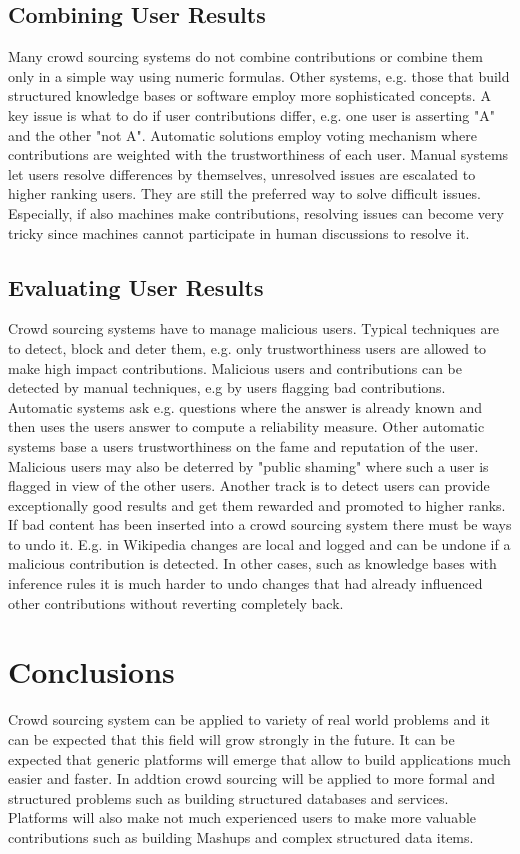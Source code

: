 \documentclass{sig-alternate}
\begin{document}
\subsection{Combining User Results}
Many crowd sourcing systems do not combine contributions or combine them only in a simple way using numeric formulas. Other systems, e.g. those that build structured knowledge bases or software employ more sophisticated concepts. A key issue is what to do if user contributions differ, e.g. one user is asserting "A" and the other "not A". Automatic solutions employ voting mechanism where contributions are weighted with the trustworthiness of each user. Manual systems let users resolve differences by themselves, unresolved issues are escalated to higher ranking users. They are still the preferred way to solve difficult issues. Especially, if also machines make contributions, resolving issues can become very tricky since machines cannot participate in human discussions to resolve it.
\subsection{Evaluating User Results}
Crowd sourcing systems have to manage malicious users. Typical techniques are to detect, block and deter them, e.g. only trustworthiness users are allowed to make high impact contributions. Malicious users and contributions can be detected by manual techniques, e.g by users flagging bad contributions. Automatic systems ask e.g. questions where the answer is already known and then uses the users answer to compute a reliability measure. Other automatic systems base a users trustworthiness on the fame and reputation of the user. Malicious users may also be deterred by "public shaming" where such a user is flagged in view of the other users. Another track is to detect users can provide exceptionally good results and get them rewarded and promoted to higher ranks.
\newline\newline
If bad content has been inserted into a crowd sourcing system there must be ways to undo it. E.g. in Wikipedia changes are local and logged and can be undone if a malicious contribution is detected. In other cases, such as knowledge bases with inference rules it is much harder to undo changes that had already influenced other contributions without reverting completely back.
\newline\newline
\section{Conclusions}
Crowd sourcing system can be applied to variety of real world problems and it can be expected that this field will grow strongly in the future. It can be expected that generic platforms will emerge that allow to build applications much easier and faster. In addtion crowd sourcing will be applied to more formal and structured problems such as building structured databases and services. Platforms will also make not much experienced users to make more valuable contributions such as building Mashups and complex structured data items.
\end{document}

